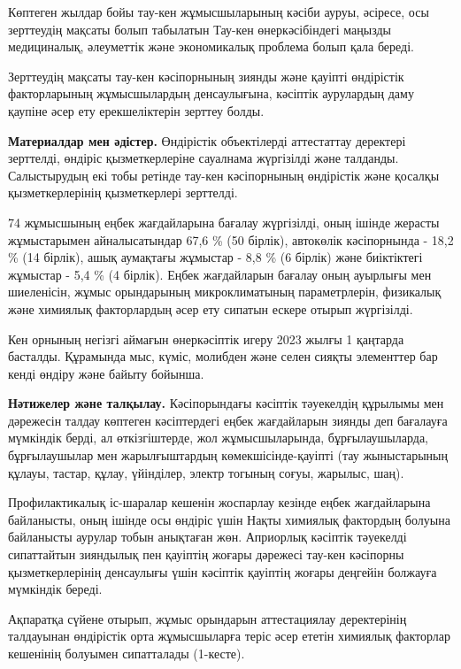 \begin{multicols}{2}
Көптеген жылдар бойы тау-кен жұмысшыларының кәсіби ауруы, әсіресе, осы
зерттеудің мақсаты болып табылатын Тау-кен өнеркәсібіндегі маңызды
медициналық, әлеуметтік және экономикалық проблема болып қала береді.

Зерттеудің мақсаты тау-кен кәсіпорнының зиянды және қауіпті өндірістік
факторларының жұмысшылардың денсаулығына, кәсіптік аурулардың даму
қаупіне әсер ету ерекшеліктерін зерттеу болды.

{\bfseries Материалдар мен әдістер.} Өндірістік объектілерді аттестаттау
деректері зерттелді, өндіріс қызметкерлеріне сауалнама жүргізілді және
талданды. Салыстырудың екі тобы ретінде тау-кен кәсіпорнының өндірістік
және қосалқы қызметкерлерінің қызметкерлері зерттелді.

74 жұмысшының еңбек жағдайларына бағалау жүргізілді, оның ішінде жерасты
жұмыстарымен айналысатындар 67,6 \% (50 бірлік), автокөлік кәсіпорнында
- 18,2 \% (14 бірлік), ашық аумақтағы жұмыстар - 8,8 \% (6 бірлік) және
биіктіктегі жұмыстар - 5,4 \% (4 бірлік). Еңбек жағдайларын бағалау оның
ауырлығы мен шиеленісін, жұмыс орындарының микроклиматының
параметрлерін, физикалық және химиялық факторлардың әсер ету сипатын
ескере отырып жүргізілді.

Кен орнының негізгі аймағын өнеркәсіптік игеру 2023 жылғы 1 қаңтарда
басталды. Құрамында мыс, күміс, молибден және селен сияқты элементтер
бар кенді өндіру және байыту бойынша.

{\bfseries Нәтижелер және талқылау.} Кәсіпорындағы кәсіптік тәуекелдің
құрылымы мен дәрежесін талдау көптеген кәсіптердегі еңбек жағдайларын
зиянды деп бағалауға мүмкіндік берді, ал өткізгіштерде, жол
жұмысшыларында, бұрғылаушыларда, бұрғылаушылар мен жарылғыштардың
көмекшісінде-қауіпті (тау жыныстарының құлауы, тастар, құлау, үйінділер,
электр тогының соғуы, жарылыс, шаң).

Профилактикалық іс-шаралар кешенін жоспарлау кезінде еңбек жағдайларына
байланысты, оның ішінде осы өндіріс үшін Нақты химиялық фактордың
болуына байланысты аурулар тобын анықтаған жөн. Априорлық кәсіптік
тәуекелді сипаттайтын зияндылық пен қауіптің жоғары дәрежесі тау-кен
кәсіпорны қызметкерлерінің денсаулығы үшін кәсіптік қауіптің жоғары
деңгейін болжауға мүмкіндік береді.

Ақпаратқа сүйене отырып, жұмыс орындарын аттестациялау деректерінің
талдауынан өндірістік орта жұмысшыларға теріс әсер ететін химиялық
факторлар кешенінің болуымен сипатталады (1-кесте).
\end{multicols}

